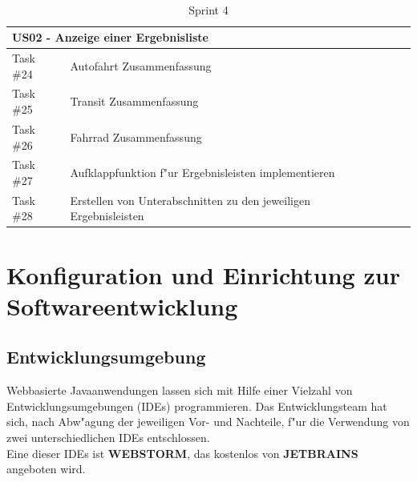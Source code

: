 \documentclass[a4paper, 11pt]{scrreprt}
\begin{document}
\begin{table}[H]

\caption{Sprint 4}

\ \\

\par

\label{tab:Sprint 4}

\centering

\begin{tabular}{|p{2.5cm} p{12cm}| ll}

\hline
\multicolumn{2}{|l|}{US02 - Anzeige einer Ergebnisliste} \\

\hline
Task \#24 & Autofahrt Zusammenfassung\\

\hline
Task \#25 & Transit Zusammenfassung\\

\hline
Task \#26 & Fahrrad Zusammenfassung\\

\hline
Task \#27 & Aufklappfunktion f"ur Ergebnisleisten implementieren\\

\hline
Task \#28 & Erstellen von Unterabschnitten zu den jeweiligen Ergebnisleisten\\

\hline
\end{tabular}

\end{table}

\section{Konfiguration und Einrichtung zur Softwareentwicklung}

\subsection{Entwicklungsumgebung}
Webbasierte Javaanwendungen lassen sich mit Hilfe einer Vielzahl von Entwicklungsumgebungen (IDEs) programmieren.
Das Entwicklungsteam hat sich, nach Abw"agung der jeweiligen Vor- und Nachteile, f"ur die Verwendung von zwei unterschiedlichen IDEs entschlossen.\\

Eine dieser IDEs ist \textbf{WEBSTORM}, das kostenlos von \textbf{JETBRAINS} angeboten wird. \\
\end{document}

